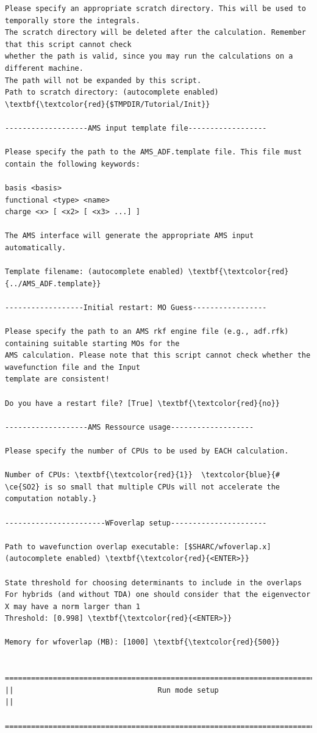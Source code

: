\documentclass[a4paper,11pt,DIV=15,openany]{scrbook}
\begin{document}
\begin{oframed}
\begin{Verbatim}[commandchars=\\\{\}]
Please specify an appropriate scratch directory. This will be used to temporally store the integrals. 
The scratch directory will be deleted after the calculation. Remember that this script cannot check 
whether the path is valid, since you may run the calculations on a different machine. 
The path will not be expanded by this script.
Path to scratch directory: (autocomplete enabled) \textbf{\textcolor{red}{$TMPDIR/Tutorial/Init}}

-------------------AMS input template file------------------

Please specify the path to the AMS_ADF.template file. This file must contain the following keywords:

basis <basis>
functional <type> <name>
charge <x> [ <x2> [ <x3> ...] ]

The AMS interface will generate the appropriate AMS input automatically.

Template filename: (autocomplete enabled) \textbf{\textcolor{red}{../AMS_ADF.template}}

------------------Initial restart: MO Guess-----------------

Please specify the path to an AMS rkf engine file (e.g., adf.rfk) containing suitable starting MOs for the 
AMS calculation. Please note that this script cannot check whether the wavefunction file and the Input 
template are consistent!

Do you have a restart file? [True] \textbf{\textcolor{red}{no}} 

-------------------AMS Ressource usage-------------------

Please specify the number of CPUs to be used by EACH calculation.

Number of CPUs: \textbf{\textcolor{red}{1}}  \textcolor{blue}{# \ce{SO2} is so small that multiple CPUs will not accelerate the computation notably.}

-----------------------WFoverlap setup----------------------

Path to wavefunction overlap executable: [$SHARC/wfoverlap.x] (autocomplete enabled) \textbf{\textcolor{red}{<ENTER>}}

State threshold for choosing determinants to include in the overlaps
For hybrids (and without TDA) one should consider that the eigenvector X may have a norm larger than 1
Threshold: [0.998] \textbf{\textcolor{red}{<ENTER>}} 

Memory for wfoverlap (MB): [1000] \textbf{\textcolor{red}{500}}

  ================================================================================
||                                 Run mode setup                                 ||
  ================================================================================



\end{Verbatim}
\end{oframed}
\end{document}
